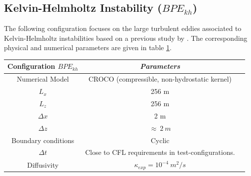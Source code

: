 \subsection{Kelvin-Helmholtz Instability ($BPE_{kh}$)}
The following configuration focuses on the large turbulent eddies associated to Kelvin-Helmholtz instabilities based on a previous study by \citet{penney_diapycnal_2019}. The corresponding physical and numerical parameters are given in table \ref{tab_BPE_KH}.
\begin{table}[h]
        \centering
        \begin{tabular}{|c|c|c|}
                \hline
                Configuration $BPE_{kh}$ & \textit{Parameters}\\
                \hline 
                Numerical Model & CROCO (compressible, non-hydrostatic kernel)\\
                $L_x$ & 256 m\\
                $L_z$ & 256 m\\
                $\Delta x$ & 2 m\\
                $\Delta z$ & $\approx\ 2\ m$\\
                Boundary conditions & Cyclic\\
                $\Delta t$ & Close to CFL requirements in test-configurations.\\
                Diffusivity & $\kappa_{exp} = 10^{-4} \ m^2/s$\\
                \hline
        \end{tabular}
        \label{tab_BPE_KH}
\end{table}
